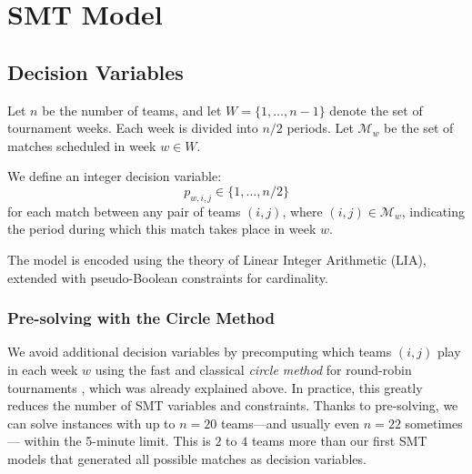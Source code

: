 


\section{SMT Model}

\subsection{Decision Variables}

Let $n$ be the number of teams, and let $W = \{1, \dots, n - 1\}$ denote the set of tournament weeks. Each week is divided into $n/2$ periods. Let $\mathcal{M}_w$ be the set of matches scheduled in week $w \in W$.

We define an integer decision variable:
\[
p_{w,i,j} \in \{1, \dots, n/2\}
\]
for each match between any pair of teams $(i,j)$, where $(i,j) \in \mathcal{M}_w$, indicating the period during which this match takes place in week $w$.

The model is encoded using the theory of Linear Integer Arithmetic (LIA), extended with pseudo-Boolean constraints for cardinality.

\subsubsection{Pre-solving with the Circle Method}
\label{CircleMatching}

We avoid additional decision variables by precomputing which teams $(i, j)$ play in each week $w$ using the fast and classical \emph{circle method} for round-robin tournaments \cite{dewerra1999}, which was already explained above.
In practice, this greatly reduces the number of SMT variables and constraints. Thanks to pre-solving, we can solve instances with up to $n=20$ teams—and usually even $n=22$ sometimes — within the 5-minute limit. This is $2$ to $4$ teams more than our first SMT models that generated all possible matches as decision variables.


